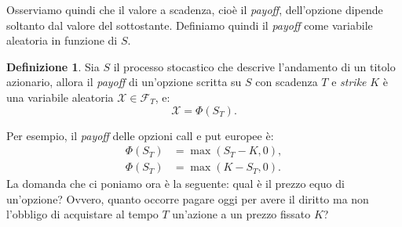\documentclass[a4paper,10pt]{report}
\theoremstyle{plain}
\theoremstyle{definition}
\newtheorem{definition}{Definizione}[chapter]
\theoremstyle{remark}
\begin{document}
Osserviamo quindi che il valore a scadenza, cio\`e il \emph{payoff}, dell'opzione dipende soltanto dal valore del sottostante. Definiamo quindi il
\emph{payoff} come variabile aleatoria in funzione di $S$.
\begin{definition}
Sia $S$ il processo stocastico che descrive l'andamento di un titolo azionario, allora il \emph{payoff} di un'opzione scritta su $S$ con scadenza $T$ e \emph{strike} $K$ \`e una variabile aleatoria $\mathcal{X}\in\mathcal{F}_T$, e: $$\mathcal{X}=\Phi(S_T).$$
\end{definition}
Per esempio, il \emph{payoff} delle opzioni call e put europee \`e:
\begin{align*}
\Phi(S_T)&=\max(S_T-K,0),\\
\Phi(S_T)&=\max(K-S_T,0).
\end{align*}
La domanda che ci poniamo ora \`e la seguente: qual \`e il prezzo equo di un'opzione? Ovvero, quanto occorre pagare oggi per avere il diritto ma non l'obbligo di acquistare al tempo $T$ un'azione a un prezzo fissato $K$?
\end{document}
